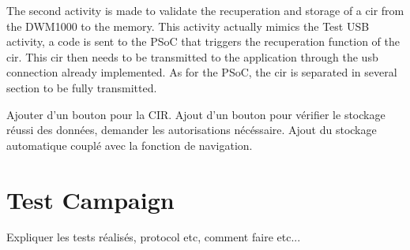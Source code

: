 The second activity is made to validate the recuperation and storage of a \gls{cir} from the DWM1000 to the memory. This activity actually mimics the Test USB activity, a code is sent to the PSoC that triggers the recuperation function of the \gls{cir}. This \gls{cir} then needs to be transmitted to the application through the \gls{usb} connection already implemented. As for the PSoC, the \gls{cir} is separated in several section to be fully transmitted.

Ajouter d'un bouton pour la CIR.
Ajout d'un bouton pour vérifier le stockage réussi des données, demander les autorisations nécéssaire.
Ajout du stockage automatique couplé avec la fonction de navigation.

\section{Test Campaign}

Expliquer les tests réalisés, protocol etc, comment faire etc...